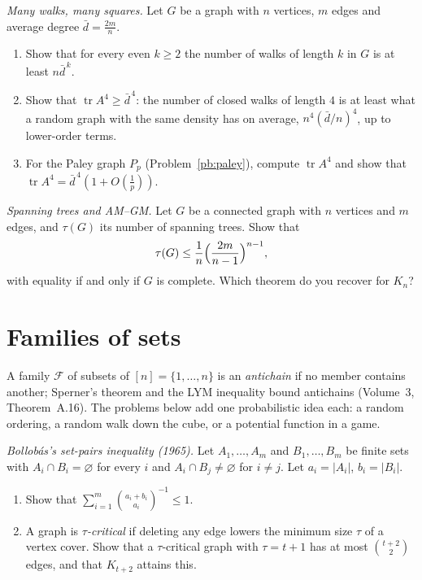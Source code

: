 \begin{exercise}[$\star\star$]\label{pb:walks}
\emph{Many walks, many squares.} Let $G$ be a graph with $n$ vertices, $m$ edges and average degree $\bar d=\frac{2m}n$.
\begin{enumerate}[label=(\alph*)]
\item Show that for every even $k\ge2$ the number of walks of length $k$ in $G$ is at least $n\bar d^{\,k}$.
\item Show that $\operatorname{tr}A^4\ge\bar d^{\,4}$: the number of closed walks of length $4$ is at least what a random graph with the same
density has on average, $n^4(\bar d/n)^4$, up to lower-order terms.
\item For the Paley graph $P_p$ (Problem~\ref{pb:paley}), compute $\operatorname{tr}A^4$ and show that $\operatorname{tr}A^4=\bar d^{\,4}(1+O(\frac1p))$.
\end{enumerate}
\end{exercise}

\begin{exercise}[$\star$]\label{pb:treebound}
\emph{Spanning trees and AM--GM.} Let $G$ be a connected graph with $n$ vertices and $m$ edges, and $\tau(G)$ its number of spanning
trees. Show that
\[
\tau(G)\le\frac1n\Bigl(\frac{2m}{n-1}\Bigr)^{n-1},
\]
with equality if and only if $G$ is complete. Which theorem do you recover for $K_n$?
\end{exercise}

\section{Families of sets}

A family $\mathcal F$ of subsets of $[n]=\{1,\dots,n\}$ is an \emph{antichain} if no member contains another; Sperner's theorem and the
LYM inequality bound antichains (Volume~3, Theorem~A.16). The problems below add one probabilistic idea each: a random
ordering, a random walk down the cube, or a potential function in a game.

\begin{exercise}[$\star\star$]\label{pb:bollobas}
\emph{Bollobás's set-pairs inequality (1965).} Let $A_1,\dots,A_m$ and $B_1,\dots,B_m$ be finite sets with $A_i\cap B_i=\varnothing$ for every
$i$ and $A_i\cap B_j\ne\varnothing$ for $i\ne j$. Let $a_i=|A_i|$, $b_i=|B_i|$.
\begin{enumerate}[label=(\alph*)]
\item Show that $\displaystyle\sum_{i=1}^m\binom{a_i+b_i}{a_i}^{-1}\le1$.
\item A graph is \emph{$\tau$-critical} if deleting any edge lowers the minimum size $\tau$ of a vertex cover. Show that a $\tau$-critical
graph with $\tau=t+1$ has at most $\binom{t+2}2$ edges, and that $K_{t+2}$ attains this.
\end{enumerate}
\end{exercise}

